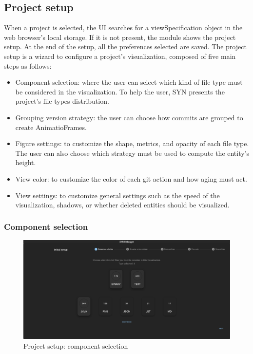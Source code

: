 \subsection{Project setup}
When a project is selected, the UI searches for a viewSpecification object in the web browser's local storage. 
If it is not present, the module shows the project setup. At the end of the setup, all the preferences selected are saved. 
The project setup is a wizard to configure a project's visualization, composed of five main steps as follows:
\begin{itemize}
    \item Component selection: where the user can select which kind of file type must be considered in the visualization. To help the user, SYN presents the project's file types distribution.
    \item Grouping version strategy: the user can choose how commits are grouped to create AnimatioFrames.
    \item Figure settings: to customize the shape, metrics, and opacity of each file type. The user can also choose which strategy must be used to compute the entity's height. 
    \item View color: to customize the color of each git action and how aging must act. 
    \item View settings: to customize general settings such as the speed of the visualization, shadows, or whether deleted entities should be visualized. 
\end{itemize}

\newpage
\subsubsection*{Component selection}

\begin{figure}[h]
    \center
    \includegraphics[width=\textwidth]{SYNUI-settings1.png}
    \caption{Project setup: component selection}
    \label{fig:SYNUIsettings1}
\end{figure}

